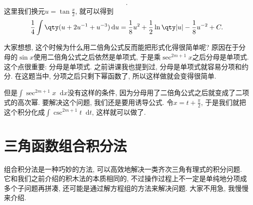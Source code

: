 \documentclass{ctexbook}
\newcommand*{\dif}{\mathop{}\!\mathrm{d}}
\begin{document}
{\begin{align*}
.\end{align*}
这里我们换元$u=\tan{\frac{x}{2}}$, 就可以得到
\begin{align*}
\frac{1}{4}\int\qty(u+2u^{-1}+u^{-3})\dif{u}=\frac{1}{8}u^{2}+\frac{1}{2}\ln\qty|u|-\frac{1}{8}u^{-2}+C
.\end{align*}\par
大家想想, 这个时候为什么用二倍角公式反而能把形式化得很简单呢? 原因在于分母的$\sin{x}$使用二倍角公式之后依然是单项式, 于是乘$\sec^{2m+1}{x}$之后分母是单项式. 这个点很重要: 分母是单项式. 之前讲课我也提到过, 分母是单项式就容易分项和约分. 在这题当中, 分项之后只剩下幂函数了, 所以这样做就会变得很简单. \par
但是$\int\sec^{2m+1}{x}\dif{x}$没有这样的条件, 因为分母用了二倍角公式之后就变成了二项式的高次幂. 要解决这个问题, 我们还是要用诱导公式. 令$x=t+\frac{\pi}{2}$, 于是我们就把这个积分化成$\int\csc^{2m+1}{t}\dif{t}$, 这样就可以做了. \par
\section{三角函数组合积分法}
组合积分法是一种巧妙的方法, 可以高效地解决一类齐次三角有理式的积分问题. 它和我们之前介绍的积木法的本质相同的, 不过操作过程上不一定是单纯地分项成多个子问题再拼凑, 还可能是通过解方程组的方法来解决问题. 大家不用急, 我慢慢来介绍. \par
}
\end{document}
